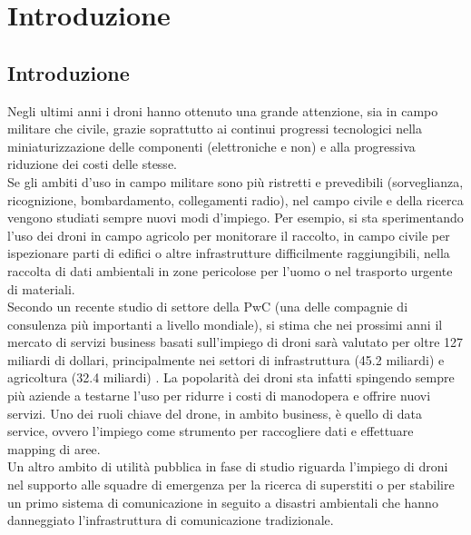 
\chapter{Introduzione}  %

\ifpdf
    \graphicspath{{Chapter1/Figs/Raster/}{Chapter1/Figs/PDF/}{Chapter1/Figs/}}
\else
    \graphicspath{{Chapter1/Figs/Vector/}{Chapter1/Figs/}}
\fi

\section{Introduzione}
Negli ultimi anni i droni hanno ottenuto una grande attenzione, sia in campo militare che civile, grazie soprattutto ai continui progressi tecnologici nella miniaturizzazione delle componenti (elettroniche e non) e alla progressiva riduzione dei costi delle stesse. \\
Se gli ambiti d'uso in campo militare sono più ristretti e prevedibili (sorveglianza, ricognizione, bombardamento, collegamenti radio), nel campo civile e della ricerca vengono studiati sempre nuovi modi d'impiego. 
Per esempio, si sta sperimentando l'uso dei droni in campo agricolo per monitorare il raccolto, in campo civile per ispezionare parti di edifici o altre infrastrutture difficilmente raggiungibili, nella raccolta di dati ambientali in zone pericolose per l'uomo o nel trasporto urgente di materiali.\\
Secondo un recente studio di settore della PwC (una delle compagnie di consulenza più importanti a livello mondiale), si stima che nei prossimi anni il mercato di servizi business basati sull'impiego di droni sarà valutato per oltre 127 miliardi di dollari, principalmente nei settori di infrastruttura (45.2 miliardi) e agricoltura (32.4 miliardi) \cite{pwc2016}. La popolarità dei droni sta infatti spingendo sempre più aziende a testarne l'uso per ridurre i costi di manodopera e offrire nuovi servizi. Uno dei ruoli chiave del drone, in ambito business, è quello di data service, ovvero l'impiego come strumento per raccogliere dati e effettuare mapping di aree. \\
Un altro ambito di utilità pubblica in fase di studio riguarda l'impiego di droni nel supporto alle squadre di emergenza per la ricerca di superstiti o per stabilire un primo sistema di comunicazione in seguito a disastri ambientali che hanno danneggiato l'infrastruttura di comunicazione tradizionale. \\
